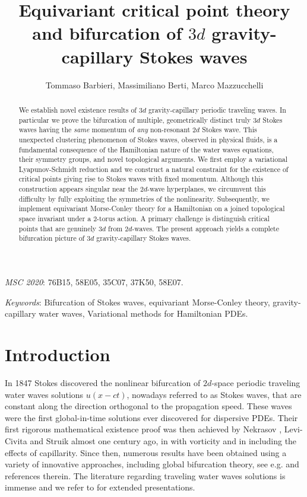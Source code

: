 \documentclass[11pt,a4paper,reqno]{article}
\title{\bf Equivariant critical point theory and bifurcation of $3d$ gravity-capillary Stokes waves}
\author{Tommaso Barbieri, Massimiliano Berti,  Marco Mazzucchelli}
\date{}
\numberwithin{equation}{section}
\theoremstyle{definition}
\begin{document}
\maketitle


\begin{abstract}
We establish novel existence 
results of $3d$ gravity-capillary periodic traveling waves. 
In particular we prove the   
bifurcation of multiple, geometrically distinct truly $3d$ Stokes waves 
having  the {\it same} momentum of {\it any} non-resonant 
$2d$ Stokes wave.
This unexpected 
clustering phenomenon of Stokes waves, 
observed in physical fluids, is 
 a 
fundamental consequence of the  Hamiltonian nature of the water waves  
equations, their  symmetry groups,  and novel %
topological   arguments. 
We first employ a variational Lyapunov-Schmidt reduction and we construct a natural constraint for the existence of critical points giving rise to Stokes waves with fixed momentum.
Although this construction appears singular 
near the $2d$-wave hyperplanes, we circumvent  this difficulty by fully 
exploiting the symmetries of the nonlinearity.  
Subsequently,  we implement  
equivariant  Morse-Conley theory 
for a Hamiltonian on a joined 
topological space invariant under a $2$-torus action. A primary challenge is distinguish  critical points that are genuinely $ 3d $ from $2d$-waves. 
 The present 
approach yields a complete  bifurcation picture of  $3d $ gravity-capillary Stokes waves.
\end{abstract}


    \smallskip
    
    \noindent 
    {{\it MSC 2020}: 76B15, 58E05, 35C07, 37K50, 58E07.} 

\smallskip

\noindent 
 {{\it Keywords}: Bifurcation of Stokes waves, equivariant Morse-Conley theory,   gravity-capillary water waves, Variational methods for Hamiltonian PDEs. 
 }
 

{  \footnotesize
\tableofcontents
}

\section{Introduction}

In 1847 Stokes \cite{stokes} discovered the nonlinear 
bifurcation of $ 2 d $-space  
periodic   traveling water waves solutions 
$  u(x-ct) $, nowadays referred to as Stokes waves, 
that are   
constant along the  direction
orthogonal to the propagation speed. 
These waves 
were the first global-in-time solutions ever discovered for dispersive PDEs.
Their first  rigorous mathematical existence 
proof  
was then achieved by Nekrasov \cite{Nek}, Levi-Civita \cite{LC}
and Struik \cite{Struik}   almost one century ago,  in \cite{goyon,dubreil} with vorticity and  in  \cite{Zei} including the effects of capillarity.   
Since then, numerous results 
have been obtained using a variety of innovative 
approaches, including global bifurcation theory, see e.g.
\cite{AFT,P1982,CSV,WW24,KK} and references therein. 
The literature
regarding  traveling water waves solutions 
is immense and we 
refer to \cite{HHSTWWW} for extended presentations.
\end{document}
